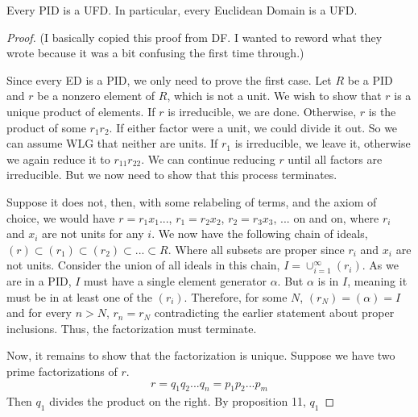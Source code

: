 \documentclass[10pt]{article}
\begin{document}
		\begin{customthm}{14}
			Every PID is a UFD. In particular, every Euclidean Domain is a UFD.
			\begin{proof}
				(I basically copied this proof from DF. I wanted to reword what they wrote because it was a bit confusing the first time through.)
				
				Since every ED is a PID, we only need to prove the first case. Let $R$ be a PID and $r$ be a nonzero element of $R$, which is not a unit. We wish to show that $r$ is a unique product of elements. If $r$ is irreducible, we are done. Otherwise, $r$ is the product of some $r_1 r_2$. If either factor were a unit, we could divide it out. So we can assume WLG that neither are units. If $r_1$ is irreducible, we leave it, otherwise we again reduce it to $r_11 r_22$. We can continue reducing $r$ until all factors are irreducible. But we now need to show that this process terminates. 
				
				Suppose it does not, then, with some relabeling of terms, and the axiom of choice, we would have $r = r_1 x_1 ...$, $r_1 = r_2 x_2$, $r_2 = r_3 x_3$, ... on and on, where $r_i$ and $x_i$ are not units for any $i$. We now have the following chain of ideals, $(r) \subset (r_1) \subset (r_2) \subset ... \subset R$. Where all subsets are proper since $r_i$ and $x_i$ are not units. Consider the union of all ideals in this chain, $I = \cup_{i=1}^{\infty} (r_i)$. As we are in a PID, $I$ must have a single element generator $\alpha$. But $\alpha$ is in $I$, meaning it must be in at least one of the $(r_i)$. Therefore, for some $N$, $(r_N) = (\alpha) = I$ and for every $n>N$, $r_n = r_N$ contradicting the earlier statement about proper inclusions. Thus, the factorization must terminate.
				
				Now, it remains to show that the factorization is unique. Suppose we have two prime factorizations of $r$.
				\begin{align*}
					r = q_1 q_2 ... q_n = p_1 p_2 ... p_m
				\end{align*}
				Then $q_1$ divides the product on the right. By proposition 11, $q_1$
				
			\end{proof}
		\end{customthm}
	
\end{document}
